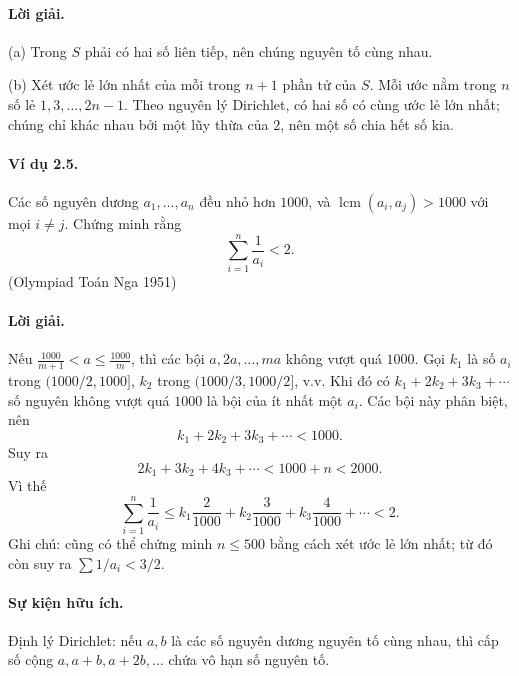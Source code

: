 \documentclass[11pt]{article}
\DeclareMathOperator{\lcm}{lcm}
\begin{document}
\paragraph{Lời giải.}
(a) Trong \(S\) phải có hai số liên tiếp, nên chúng nguyên tố cùng nhau.

(b) Xét ước lẻ lớn nhất của mỗi trong \(n+1\) phần tử của \(S\). Mỗi ước nằm
trong \(n\) số lẻ \(1,3,\ldots,2n-1\). Theo nguyên lý Dirichlet, có hai số có
cùng ước lẻ lớn nhất; chúng chỉ khác nhau bởi một lũy thừa của \(2\), nên một
số chia hết số kia.

\paragraph{Ví dụ 2.5.}
Các số nguyên dương \(a_1,\ldots,a_n\) đều nhỏ hơn \(1000\), và
\(\lcm(a_i,a_j)>1000\) với mọi \(i\ne j\). Chứng minh rằng
\[
 \sum_{i=1}^n\frac1{a_i}<2.
\]
(Olympiad Toán Nga 1951)

\paragraph{Lời giải.}
Nếu \(\frac{1000}{m+1}<a\le\frac{1000}{m}\), thì các bội
\(a,2a,\ldots,ma\) không vượt quá \(1000\). Gọi \(k_1\) là số \(a_i\) trong
\((1000/2,1000]\), \(k_2\) trong \((1000/3,1000/2]\), v.v. Khi đó có
\(k_1+2k_2+3k_3+\cdots\) số nguyên không vượt quá \(1000\) là bội của ít nhất
một \(a_i\). Các bội này phân biệt, nên
\[
 k_1+2k_2+3k_3+\cdots<1000.
\]
Suy ra
\[
 2k_1+3k_2+4k_3+\cdots
 <1000+n<2000.
\]
Vì thế
\[
 \sum_{i=1}^n\frac1{a_i}
 \le k_1\frac2{1000}+k_2\frac3{1000}+k_3\frac4{1000}+\cdots<2.
\]
Ghi chú: cũng có thể chứng minh \(n\le500\) bằng cách xét ước lẻ lớn nhất;
từ đó còn suy ra \(\sum 1/a_i<3/2\).

\paragraph{Sự kiện hữu ích.}
Định lý Dirichlet: nếu \(a,b\) là các số nguyên dương nguyên tố cùng nhau, thì
cấp số cộng \(a,a+b,a+2b,\ldots\) chứa vô hạn số nguyên tố.
\end{document}
